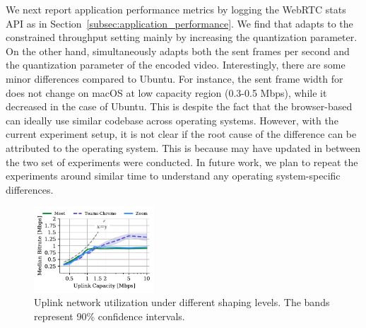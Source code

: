 We next report application performance metrics by logging the WebRTC stats API as in Section~\ref{subsec:application_performance}. We find that \meet adapts to the constrained throughput setting mainly by increasing the quantization parameter. On the other hand, \teamsbrowser simultaneously adapts both the sent frames per second and the quantization parameter of the encoded video. Interestingly, there are some minor differences compared to Ubuntu. For instance, the sent frame width for \meet does not change on macOS at low capacity region (0.3-0.5 Mbps), while it decreased in the case of Ubuntu. This is despite the fact that the browser-based \meet can ideally use similar codebase across operating systems. However, with the current experiment setup, it is not clear if the root cause of the difference can be attributed to the operating system. This is because \meet may have updated in between the two set of experiments were conducted. In future work, we plan to repeat the experiments around similar time to understand any operating system-specific differences. 

\begin{figure}[]
    \centering
    \includegraphics[width=0.4\textwidth,keepaspectratio]{figures/static_mac/uplink_mac.pdf}
\caption{Uplink network utilization under different shaping levels. The bands represent 90\% confidence intervals.}
\label{fig:uplink_static_mac}
\end{figure}


